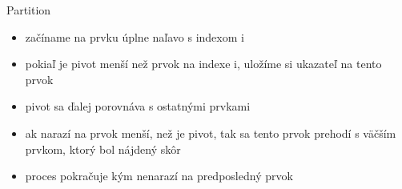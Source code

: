 \documentclass[10pt]{beamer}
\begin{document}
\begin{frame}{Partition}
    \begin{itemize}
        \item začíname na prvku úplne naľavo s indexom i
        \item pokiaľ je pivot menší než prvok na indexe i, uložíme si ukazateľ na tento prvok
        \item pivot sa ďalej porovnáva s ostatnými prvkami
        \item ak narazí na prvok menší, než je pivot, tak sa tento prvok prehodí s väčším prvkom, ktorý bol nájdený skôr
        \item proces pokračuje kým nenarazí na predposledný prvok
    \end{itemize}
\end{frame}
\end{document}
